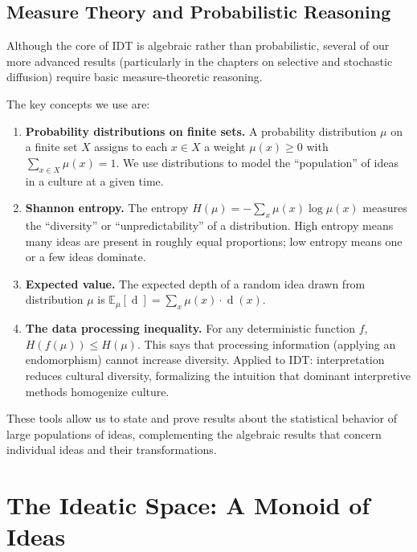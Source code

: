 \documentclass[11pt,openany]{book}
\theoremstyle{definition}
\theoremstyle{plain}
\theoremstyle{remark}
\newcommand{\depth}{\operatorname{d}}       %
\begin{document}
\section{Measure Theory and Probabilistic Reasoning}

Although the core of IDT is algebraic rather than probabilistic, several of our more advanced results (particularly in the chapters on selective and stochastic diffusion) require basic measure-theoretic reasoning.

The key concepts we use are:

\begin{enumerate}
\item \textbf{Probability distributions on finite sets.} A probability distribution $\mu$ on a finite set $X$ assigns to each $x \in X$ a weight $\mu(x) \geq 0$ with $\sum_{x \in X} \mu(x) = 1$. We use distributions to model the ``population'' of ideas in a culture at a given time.

\item \textbf{Shannon entropy.} The entropy $H(\mu) = -\sum_{x} \mu(x) \log \mu(x)$ measures the ``diversity'' or ``unpredictability'' of a distribution. High entropy means many ideas are present in roughly equal proportions; low entropy means one or a few ideas dominate.

\item \textbf{Expected value.} The expected depth of a random idea drawn from distribution $\mu$ is $\mathbb{E}_\mu[\depth] = \sum_x \mu(x) \cdot \depth(x)$.

\item \textbf{The data processing inequality.} For any deterministic function $f$, $H(f(\mu)) \leq H(\mu)$. This says that processing information (applying an endomorphism) cannot increase diversity. Applied to IDT: interpretation reduces cultural diversity, formalizing the intuition that dominant interpretive methods homogenize culture.
\end{enumerate}

These tools allow us to state and prove results about the statistical behavior of large populations of ideas, complementing the algebraic results that concern individual ideas and their transformations.

\chapter{The Ideatic Space: A Monoid of Ideas}
\label{ch:ideatic-space}
\end{document}
